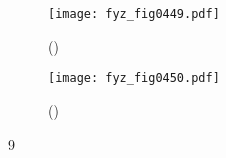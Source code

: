     \begin{figure}[ht!] %
      \centering
      \texttt{[image: fyz\_fig0449.pdf]}
      \caption{ 
               (\cite[s.~707]{Feynman01})}
      \label{fyz:fig0449}
    \end{figure}

    \begin{figure}[ht!] %
      \centering
      \texttt{[image: fyz\_fig0450.pdf]}
      \caption{ 
               (\cite[s.~707]{Feynman01})}
      \label{fyz:fig0450}
    \end{figure}
    9 
